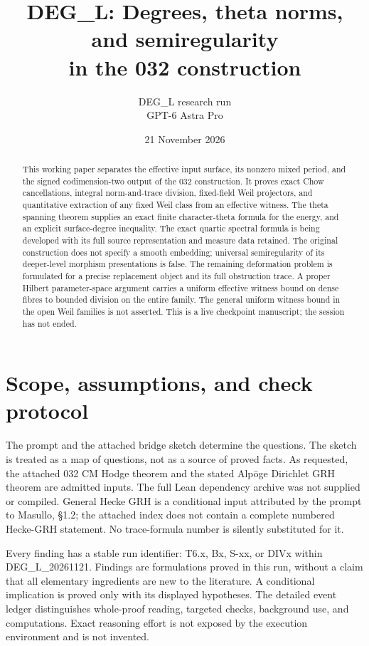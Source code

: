 \documentclass[11pt,a4paper]{article}
\title{DEG\_L: Degrees, theta norms, and semiregularity\\
in the 032 construction}
\author{DEG\_L research run\\GPT-6 Astra Pro}
\date{21 November 2026}
\theoremstyle{definition}
\begin{document}
\maketitle
\begin{abstract}
This working paper separates the effective input surface, its nonzero mixed
period, and the signed codimension-two output of the 032 construction.
It proves exact Chow cancellations, integral norm-and-trace division,
fixed-field Weil projectors, and quantitative extraction of any fixed Weil
class from an effective witness. The theta spanning theorem supplies an
exact finite character-theta formula for the energy, and an explicit
surface-degree inequality. The exact quartic spectral formula is being
developed with its full source representation and measure data retained.
The original construction does not specify a smooth embedding; universal
semiregularity of its deeper-level morphism presentations is false. The
remaining deformation problem is formulated for a precise replacement
object and its full obstruction trace. A proper Hilbert parameter-space
argument carries a uniform effective witness bound on dense fibres to
bounded division on the entire family. The general uniform witness bound
in the open Weil families is not asserted. This is a live checkpoint
manuscript; the session has not ended.
\end{abstract}
\tableofcontents
\clearpage
\section{Scope, assumptions, and check protocol}
The prompt and the attached bridge sketch determine the questions. The
sketch is treated as a map of questions, not as a source of proved facts.
As requested, the attached 032 CM Hodge theorem and the stated Alp\"oge
Dirichlet GRH theorem are admitted inputs. The full Lean dependency archive
was not supplied or compiled. General Hecke GRH is a conditional input
attributed by the prompt to Masullo, \S1.2; the attached index does not
contain a complete numbered Hecke-GRH statement. No trace-formula number
is silently substituted for it.

Every finding has a stable run identifier: T6.x, Bx, S-xx, or DIVx within
DEG\_L\_20261121. Findings are formulations proved in this run, without a
claim that all elementary ingredients are new to the literature. A
conditional implication is proved only with its displayed hypotheses.
The detailed event ledger distinguishes whole-proof reading, targeted
checks, background use, and computations. Exact reasoning effort is not
exposed by the execution environment and is not invented.
\end{document}
